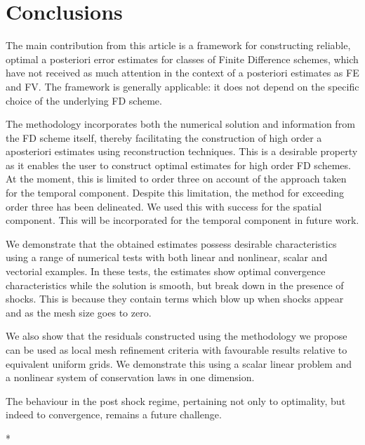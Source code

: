 \documentclass[final]{amsart}
\numberwithin{equation}{section}
\begin{document}
\section{Conclusions}\label{sec:conclusion}
The main contribution from this article is a framework for constructing reliable, optimal a posteriori error estimates for classes of Finite Difference schemes, which have not received as much attention in the context of a posteriori estimates as FE and FV.   The framework is generally applicable: it does not depend on the specific choice of the underlying FD scheme.

The methodology incorporates both the numerical solution and information from the FD scheme itself, thereby facilitating the construction of high order a aposteriori estimates using reconstruction techniques. This is  a desirable property as it enables the user to construct optimal estimates for high order FD schemes.  
At the moment, this is limited to order three on account of the approach taken for the temporal component. Despite this limitation, the method for exceeding order three has been delineated.  We used this with success for the spatial component.  This will be incorporated for the temporal component  in future work.



We demonstrate that the  obtained estimates possess desirable characteristics using a range of numerical tests with both linear and nonlinear, scalar and vectorial examples.  In these tests, the estimates show optimal convergence characteristics while the solution is smooth, but break down in the presence of shocks.  This is because they contain terms which blow up when shocks appear and as the mesh size goes to zero.

We also show that the residuals constructed using the methodology we propose can be used as local mesh refinement criteria with favourable results relative to equivalent uniform grids.  We demonstrate this using a scalar linear problem and a nonlinear system of conservation laws in one dimension.

The behaviour in the post shock regime, pertaining not only to optimality, but indeed to convergence, remains a future challenge.


 
  \/*
\end{document}
